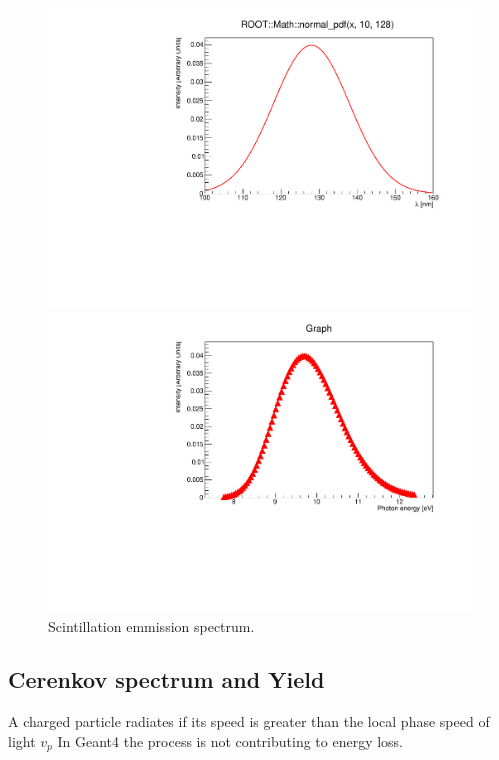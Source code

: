 \documentclass[a4paper]{jpconf}
\begin{document}
\begin{figure}
\centering
\begin{minipage}{.5\textwidth}
  \centering
  \includegraphics[width=.7\linewidth]{spectrum.pdf}
\end{minipage}%
\begin{minipage}{.5\textwidth}
  \centering
  \includegraphics[width=.7\linewidth]{spectrumE.pdf}
\end{minipage}
\caption{\label{fig:spectrum}Scintillation emmission spectrum.}
\end{figure}

\subsection{Cerenkov spectrum and Yield}
A charged particle radiates if its speed is greater than the local phase speed of light $v_p$
In Geant4 the process is not contributing to energy loss.
\end{document}

